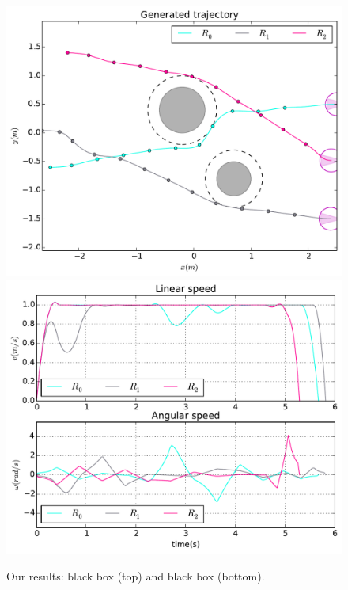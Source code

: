 \documentclass[eprint]{actapoly}
\begin{document}
\begin{figure}\centering
  \includegraphics[width=\linewidth]{./images/no_collision/multirobot-path.pdf} 
  \\[1mm]
  \includegraphics[width=\linewidth]{./images/no_collision/multirobot-vw.pdf} %
  \caption{Our results: black box (top) and black box 
(bottom).\label{fig:nocollision}}
\label{fig:res}
\end{figure}
\end{document}
